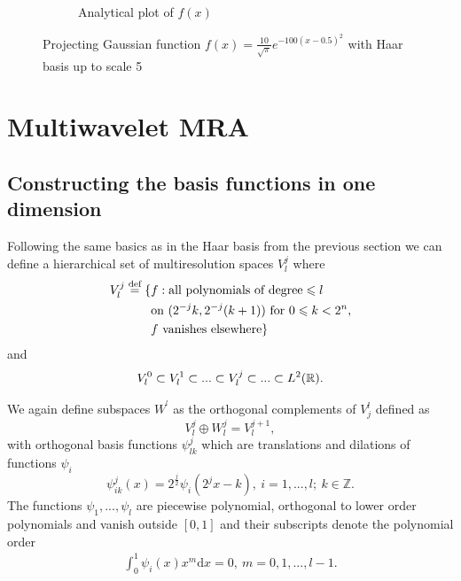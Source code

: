 \documentclass[../master_thesis.tex]{subfiles}
\begin{document}
\begin{figure}[h!]
\begin{subfigure}[b]{0.49\linewidth}
    \caption{Analytical plot of $f(x)$}
  \end{subfigure}
  \caption{Projecting Gaussian function $f(x) = \frac{10}{\sqrt{\pi}}e^{-100(x - 0.5)^2}$ with
  Haar basis up to scale 5}
  \label{fig:Hargaussproject}
\end{figure}


\section{Multiwavelet \ac{MRA}}
\subsection{Constructing the basis functions in one dimension}
Following the same basics as in the Haar basis from the previous section we can
define a hierarchical set of multiresolution spaces $V^j_l$ where \cite{Frediani:2013}
\begin{align}
  \begin{split}
    V^j_l \stackrel{\text{def}}{=} \{&f: \text{all polynomials of degree} \leqslant
    l\  \\
    &\text{on}\  (2^{-j}k,2^{-j}(k+1))\ \text{for}\ 0\leqslant k < 2^{n},\\
    &f\  \text{vanishes elsewhere}\}
  \end{split}
\end{align}
and
\begin{equation}
  V^0_l \subset V^1_l \subset ... \subset V_l^j \subset ... \subset L^2(\mathbb{R}).
\end{equation}

We again define subspaces $W^^l$ as the orthogonal complements of $V^l_j$
\cite{Alpert1993} defined as
\begin{equation}
  V_l^j \oplus W^j_l = V_l^{j+1},
\end{equation}
 with orthogonal basis functions  $\psi^j_{lk}$ which are translations and dilations of functions $\psi_i$
 \begin{equation}
   \psi^j_{ik}(x) = 2^\frac{j}{2}\psi_i(2^jx-k), \ i=1, ...,l;\ k \in \mathbb{Z}.\label{eq:mwbasisfuncs}
 \end{equation}
 The functions $\psi_1, ...,\psi_l$ are piecewise polynomial, orthogonal to lower order polynomials and
 vanish outside $[0,1]$ and their subscripts denote the polynomial order \cite{Alpert1993}
\begin{align}
  \int_0^1\psi_i(x)x^m \text{d}x = 0,\ m = 0, 1, ..., l-1.
\end{align}
\end{document}
